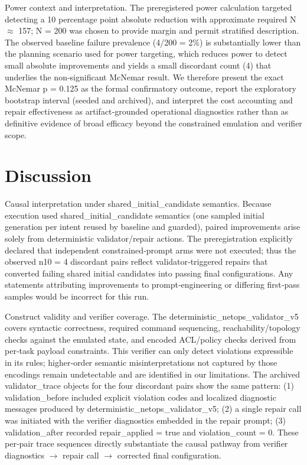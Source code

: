 \documentclass[conference]{IEEEtran}
\begin{document}
Power context and interpretation. The preregistered power calculation targeted detecting a 10 percentage point absolute reduction with approximate required N \ensuremath{\approx} 157; N = 200 was chosen to provide margin and permit stratified description. The observed baseline failure prevalence (4/200 = 2\%) is substantially lower than the planning scenario used for power targeting, which reduces power to detect small absolute improvements and yields a small discordant count (4) that underlies the non‑significant McNemar result. We therefore present the exact McNemar p = 0.125 as the formal confirmatory outcome, report the exploratory bootstrap interval (seeded and archived), and interpret the cost accounting and repair effectiveness as artifact‑grounded operational diagnostics rather than as definitive evidence of broad efficacy beyond the constrained emulation and verifier scope.

\section{Discussion}
Causal interpretation under shared\_initial\_candidate semantics. Because execution used shared\_initial\_candidate semantics (one sampled initial generation per intent reused by baseline and guarded), paired improvements arise solely from deterministic validator/repair actions. The preregistration explicitly declared that independent constrained‑prompt arms were not executed; thus the observed n10 = 4 discordant pairs reflect validator‑triggered repairs that converted failing shared initial candidates into passing final configurations. Any statements attributing improvements to prompt‑engineering or differing first‑pass samples would be incorrect for this run.

Construct validity and verifier coverage. The deterministic\_netops\_validator\_v5 covers syntactic correctness, required command sequencing, reachability/topology checks against the emulated state, and encoded ACL/policy checks derived from per‑task payload constraints. This verifier can only detect violations expressible in its rules; higher‑order semantic misinterpretations not captured by those encodings remain undetectable and are identified in our limitations. The archived validator\_trace objects for the four discordant pairs show the same pattern: (1) validation\_before included explicit violation codes and localized diagnostic messages produced by deterministic\_netops\_validator\_v5; (2) a single repair call was initiated with the verifier diagnostics embedded in the repair prompt; (3) validation\_after recorded repair\_applied = true and violation\_count = 0. These per‑pair trace sequences directly substantiate the causal pathway from verifier diagnostics \ensuremath{\rightarrow} repair call \ensuremath{\rightarrow} corrected final configuration.
\end{document}
